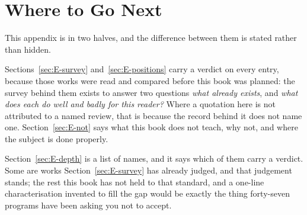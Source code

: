 %
%
%

\chapter{Where to Go Next}
\label{app:E}

\noindent
This appendix is in two halves, and the difference between them is stated
rather than hidden.

Sections~\ref{sec:E-survey} and~\ref{sec:E-positions} carry a verdict on every
entry, because those works were read and compared before this book was
planned: the survey behind them exists to answer two questions \dash{}
\emph{what already exists}, and \emph{what does each do well and badly for this
reader?} Where a quotation here is not attributed to a named review, that is
because the record behind it does not name one.
Section~\ref{sec:E-not} says what this book does not teach, why not, and where
the subject is done properly.

Section~\ref{sec:E-depth} is a list of names, and it says which of them carry a
verdict. Some are works Section~\ref{sec:E-survey} has already judged, and that
judgement stands; the rest this book has not held to that standard, and a
one-line characterisation invented to fill the gap would be exactly the thing
forty-seven programs have been asking you not to accept.


